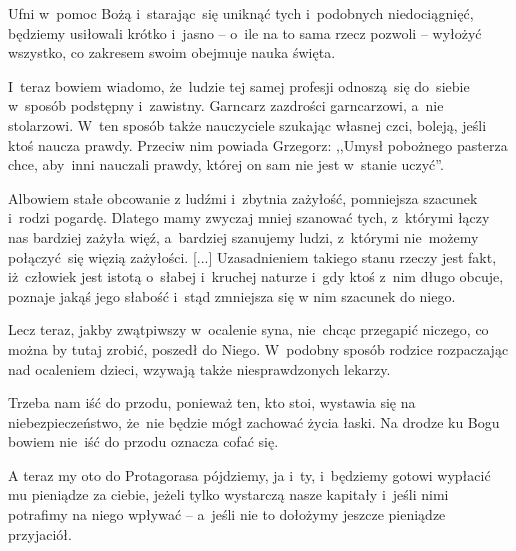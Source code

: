 Ufni w~pomoc Bożą i~starając~się uniknąć tych i~podobnych
niedociągnięć, będziemy usiłowali krótko i~jasno -- o~ile na to sama
rzecz pozwoli -- wyłożyć wszystko, co zakresem swoim obejmuje nauka
święta.



\noi I~teraz bowiem wiadomo, że~ludzie tej samej profesji odnoszą~się
do~siebie w~sposób podstępny i~zawistny. Garncarz zazdrości
garncarzowi, a~nie stolarzowi. W~ten sposób także nauczyciele szukając
własnej czci, boleją, jeśli ktoś naucza prawdy. Przeciw nim powiada
Grzegorz: ,,Umysł pobożnego pasterza chce, aby~inni nauczali prawdy,
której on sam nie jest w~stanie uczyć''.


\noi Albowiem stałe obcowanie z ludźmi i~zbytnia zażyłość, pomniejsza
szacunek i~rodzi pogardę. Dlatego mamy zwyczaj mniej szanować tych,
z~którymi łączy nas bardziej zażyła więź, a~bardziej szanujemy ludzi,
z~którymi nie~możemy połączyć~się więzią zażyłości. [...]
Uzasadnieniem takiego stanu rzeczy jest fakt, iż~człowiek jest istotą
o~słabej i~kruchej naturze i~gdy ktoś z~nim długo obcuje, poznaje
jakąś jego słabość i~stąd zmniejsza się w nim szacunek do niego.


\noi Lecz teraz, jakby zwątpiwszy w~ocalenie syna, nie~chcąc przegapić
niczego, co można by tutaj zrobić, poszedł do Niego. W~podobny sposób
rodzice rozpaczając nad ocaleniem dzieci, wzywają także
niesprawdzonych lekarzy.


\noi Trzeba nam iść do przodu, ponieważ ten, kto stoi, wystawia się na
niebezpieczeństwo, że~nie będzie mógł zachować życia łaski. Na drodze
ku Bogu bowiem nie~iść do przodu oznacza cofać się.









\noi A teraz my oto do Protagorasa pójdziemy, ja i~ty, i~będziemy
gotowi wypłacić mu pieniądze za ciebie, jeżeli tylko wystarczą nasze
kapitały i~jeśli nimi potrafimy na niego wpływać -- a~jeśli nie to
dołożymy jeszcze pieniądze przyjaciół.

